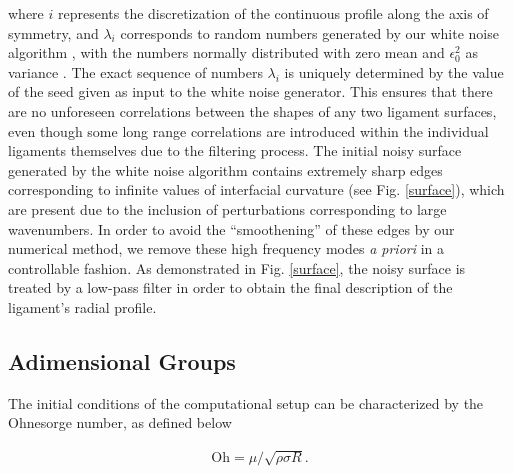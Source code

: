 where $i$ represents the discretization of the continuous profile 
along the axis of symmetry, and $\lambda_i$ corresponds to random numbers
generated by our white noise algorithm  
, with the numbers normally 
distributed with zero mean and $\epsilon_{0}^{2}$ as variance .
The exact sequence of numbers $\lambda_i$ is uniquely determined 
by the value of the seed given as input to the white noise generator.
This ensures that there are no unforeseen correlations between the shapes of any two
ligament surfaces, even though some long range correlations are introduced
within the individual ligaments themselves due to the filtering process. 
The initial noisy surface generated by the white noise algorithm
contains extremely sharp edges corresponding to infinite values of 
interfacial curvature (see Fig. \ref{surface}), which are present due
to the inclusion of perturbations corresponding to large wavenumbers. 
In order to avoid the ``smoothening'' of these edges by our numerical method,   
we remove these high frequency modes \textit{a priori} in a controllable fashion. 
As demonstrated in Fig. \ref{surface}, the noisy surface is treated by a low-pass filter 
in order to obtain the final description of the ligament's radial profile. 


\subsection*{Adimensional Groups}

The initial conditions of the computational setup can be 
characterized by the Ohnesorge number, as defined below   

\begin{align}
	\textrm{Oh} = \mu / \sqrt{\rho \sigma R} . 
\end{align}

